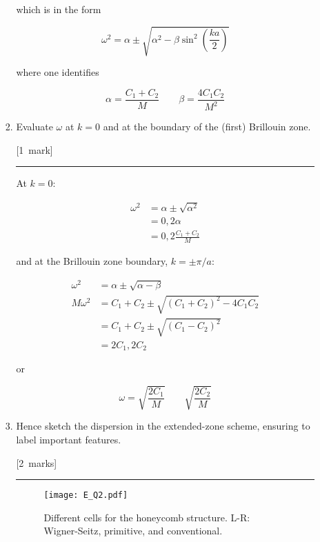 \documentclass[12pt,a4paper]{article}
\newcommand{\sepline}[0]{\par \hfil\rule{10cm}{0.4pt} \vspace*{\parskip}\hfil}
\begin{document}
\begin{enumerate}
\begin{enumerate}
\begin{enumerate}
\begin{answer}
							which is in the form

							$$ \omega^2 = \alpha \pm \sqrt{\alpha^2 - \beta \sin^2 \left(\frac{ka}{2}\right)} $$

							where one identifies

							$$
							\alpha = \frac{C_1 + C_2}{M} \qquad \beta = \frac{4 C_1 C_2}{M^2}
							$$

						\end{answer}

						\item Evaluate $\omega$ at $k=0$ and at the boundary of the (first) Brillouin zone.

						\hfill{[1~mark]}

						\begin{answer}

							\sepline

							At $k=0$:

							\begin{align*}
								\omega^2 & = \alpha \pm \sqrt{\alpha^2} \\
								& = 0, 2\alpha \\
								& = 0, 2\frac{C_1 + C_2}{M}
							\end{align*}

							and at the Brillouin zone boundary, $k = \pm{\pi}/a$:

							\begin{align*}
								\omega^2 & = \alpha \pm \sqrt{\alpha - \beta} \\
								M\omega^2 & = C_1 + C_2 \pm \sqrt{(C_1 + C_2)^2 - 4 C_1 C_2} \\
								& = C_1 + C_2 \pm \sqrt{(C_1 - C_2)^2} \\
								& = 2C_1 , 2C_2
							\end{align*}

							or

							$$
							\omega = \sqrt{\frac{2 C_1}{M}} \qquad \sqrt{\frac{2 C_2}{M}}
							$$

						\end{answer}

						\item Hence sketch the dispersion in the extended-zone scheme, ensuring to label important features.

						\hfill{[2~marks]}

						\begin{answer}

							\sepline

							\begin{figure}[h]
								\centering
								\texttt{[image: E\_Q2.pdf]}
								\caption{Different cells for the honeycomb structure. L-R: Wigner-Seitz, primitive, and conventional.}
							\end{figure}


\end{answer}
\end{enumerate}
\end{enumerate}
\end{enumerate}
\end{document}
